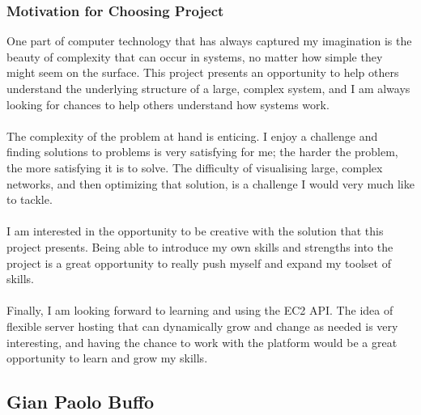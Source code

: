 \documentclass{article}
\begin{document}
		\subsubsection{Motivation for Choosing Project}
			One part of computer technology that has always captured my imagination is the beauty of complexity that can occur in systems, no matter how simple they might seem on the surface. This project presents an opportunity to help others understand the underlying structure of a large, complex system, and I am always looking for chances to help others understand how systems work.
\\\\		
			The complexity of the problem at hand is enticing. I enjoy a challenge and finding solutions to problems is very satisfying for me; the harder the problem, the more satisfying it is to solve. The difficulty of visualising large, complex networks, and then optimizing that solution, is a challenge I would very much like to tackle.
\\\\			
			I am interested in the opportunity to be creative with the solution that this project presents. Being able to introduce my own skills and strengths into the project is a great opportunity to really push myself and expand my toolset of skills.
\\\\			
			Finally, I am looking forward to learning and using the EC2 API. The idea of flexible server hosting that can dynamically grow and change as needed is very interesting, and having the chance to work with the platform would be a great opportunity to learn and grow my skills.
		
	\cleardoublepage	
	
	\subsection{Gian Paolo Buffo}
	
\end{document}
